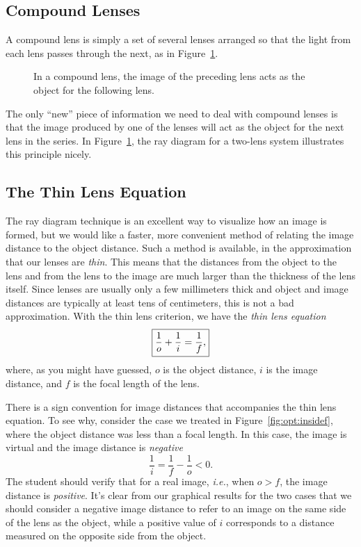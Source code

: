 \subsection{Compound Lenses}

A compound lens is simply a set of several lenses arranged so that the light
from each lens passes through the next, as in Figure~\ref{fig:opt:compounddef}.
\begin{figure}[h]
\centerline{\epsfxsize=14cm }
\caption{In a compound lens, the image of the preceding lens acts as the object
for the following lens.}
\label{fig:opt:compounddef}
\end{figure}
The only ``new'' piece of information we need to deal with compound lenses is
that the image produced by one of the lenses will act as the object for the 
next lens in the series. In Figure~\ref{fig:opt:compounddef}, the ray diagram 
for a two-lens system illustrates this principle nicely.

\subsection{The Thin Lens Equation} 

The ray diagram technique is an excellent way to visualize how an image is 
formed, but we would like a faster, more convenient method of relating the 
image distance to the object distance. Such a method is available, in the 
approximation that our lenses are {\it thin}. This means that the distances 
from the object to the lens and from the lens to the image are much larger 
than the thickness of the lens itself.  Since lenses are usually only a few 
millimeters thick and object and image distances are typically at least tens 
of centimeters, this is not a bad approximation.  With the thin lens 
criterion, we have 
the {\em thin lens equation}
\begin{equation}
\fbox{$ \displaystyle \frac{1}{o} + \frac{1}{i} = \frac{1}{f}, $} \label{eq:opt:thinlens}
\end{equation}
where, as you might have guessed, $o$ is the object distance, $i$ is the image 
distance, and $f$ is the focal length of the lens.

There is a sign convention for image distances that accompanies the thin lens 
equation. To see why, consider the case we treated in 
Figure~\ref{fig:opt:insidef}, where the object distance was less than a focal
length. In this case, the image is virtual and the image distance is 
{\it negative}
$$
\frac{1}{i}=\frac{1}{f}-\frac{1}{o} < 0.
$$
The student should verify that for a real image, {\it i.e.}, when $o>f$, the 
image distance is {\it positive}.  It's clear from our graphical results for 
the two cases that we should consider a negative image distance to refer to an
image on the same side of the lens as the object, while a positive value of 
$i$ corresponds to a distance measured on the opposite side from the object.

